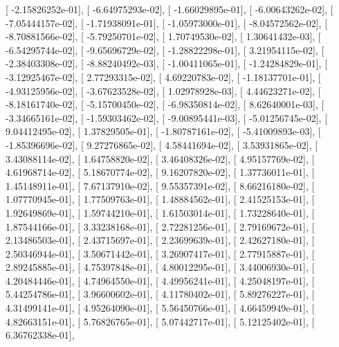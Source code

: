 \documentclass{article}
\begin{document}
       [ -2.15826252e-01],
       [ -6.64975293e-02],
       [ -1.66029895e-01],
       [ -6.00643262e-02],
       [ -7.05444157e-02],
       [ -1.71938091e-01],
       [ -1.05973000e-01],
       [ -8.04572562e-02],
       [ -8.70881566e-02],
       [ -5.79250701e-02],
       [  1.70749530e-02],
       [  1.30641432e-03],
       [ -6.54295744e-02],
       [ -9.65696729e-02],
       [ -1.28822298e-01],
       [  3.21954115e-02],
       [ -2.38403308e-02],
       [ -8.88240492e-03],
       [ -1.00411065e-01],
       [ -1.24284829e-01],
       [ -3.12925467e-02],
       [  2.77293315e-02],
       [  4.69220783e-02],
       [ -1.18137701e-01],
       [ -4.93125956e-02],
       [ -3.67623528e-02],
       [  1.02978928e-03],
       [  4.44623271e-02],
       [ -8.18161740e-02],
       [ -5.15700450e-02],
       [ -6.98350814e-02],
       [  8.62640001e-03],
       [ -3.34665161e-02],
       [ -1.59303462e-02],
       [ -9.00895441e-03],
       [ -5.01256745e-02],
       [  9.04412495e-02],
       [  1.37829505e-01],
       [ -1.80787161e-02],
       [ -5.41009893e-03],
       [ -1.85396696e-02],
       [  9.27276865e-02],
       [  4.58441694e-02],
       [  3.53931865e-02],
       [  3.43088114e-02],
       [  1.64758820e-02],
       [  3.46408326e-02],
       [  4.95157769e-02],
       [  4.61968714e-02],
       [  5.18670774e-02],
       [  9.16207820e-02],
       [  1.37736011e-01],
       [  1.45148911e-01],
       [  7.67137910e-02],
       [  9.55357391e-02],
       [  8.66216180e-02],
       [  1.07770945e-01],
       [  1.77509763e-01],
       [  1.48884562e-01],
       [  2.41525153e-01],
       [  1.92649869e-01],
       [  1.59744210e-01],
       [  1.61503014e-01],
       [  1.73228640e-01],
       [  1.87544166e-01],
       [  3.33238168e-01],
       [  2.72281256e-01],
       [  2.79169672e-01],
       [  2.13486503e-01],
       [  2.43715697e-01],
       [  2.23699639e-01],
       [  2.42627180e-01],
       [  2.50346944e-01],
       [  3.50671442e-01],
       [  3.26907417e-01],
       [  2.77915887e-01],
       [  2.89245885e-01],
       [  4.75397848e-01],
       [  4.80012295e-01],
       [  3.44006930e-01],
       [  4.20484446e-01],
       [  4.74964550e-01],
       [  4.49956241e-01],
       [  4.25048197e-01],
       [  5.44254786e-01],
       [  3.96600602e-01],
       [  4.11780402e-01],
       [  5.89276227e-01],
       [  4.31499141e-01],
       [  4.95264090e-01],
       [  5.56450766e-01],
       [  4.66459949e-01],
       [  4.82663151e-01],
       [  5.76826765e-01],
       [  5.07442717e-01],
       [  5.12125402e-01],
       [  6.36762338e-01],
\end{document}
